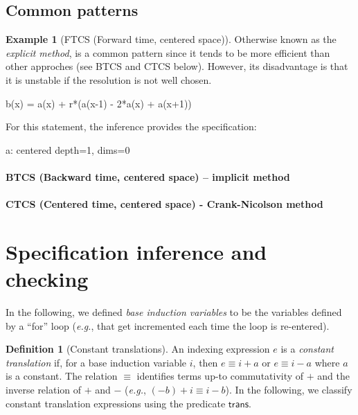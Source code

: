 \documentclass[10pt]{sigplanconf}
\newcounter{block}
\theoremstyle{definition}
\newtheorem{example}[block]{Example}
\newtheorem{definition}[block]{Definition}
\newcommand{\eg}{\emph{e.g.}}
\begin{document}
\subsection{Common patterns}

\begin{example}[FTCS (Forward time, centered space)]

  Otherwise known as the \emph{explicit method}, is a common
  pattern since it tends to be more efficient than other approches
  (see BTCS and CTCS below). However, its disadvantage is that it is
  unstable if the resolution is not well chosen. 

\begin{ExmVerbatim}
b(x) = a(x) + r*(a(x-1) - 2*a(x) + a(x+1))
\end{ExmVerbatim}
%
For this statement, the inference provides the specification: 
%
\begin{SpecVerbatim}
a: centered depth=1, dims=0
\end{SpecVerbatim}



\end{example}

\paragraph{BTCS (Backward time, centered space) -- implicit method}

\paragraph{CTCS (Centered time, centered space) - Crank-Nicolson method}



\section{Specification inference and checking}
\label{sec:analysis}

In the following, we defined
\emph{base induction variables} to be the variables
 defined by a ``for'' loop (\eg{}, that get incremented each time the
loop is re-entered). 

\begin{definition}[Constant translations]
An indexing expression $e$ is a \emph{constant translation} if,
for a base induction variable $i$, then $e \equiv i + a$ or $e \equiv i - a$ 
where $a$ is a constant. The relation $\equiv$ identifies terms
up-to commutativity of $+$ and the inverse
relation of $+$ and $-$ (\eg{}, $(-b) + i \equiv i - b$). 
In the following, we classify constant translation expressions 
using the predicate $\textsf{trans}$.
\end{definition}
\end{document}
